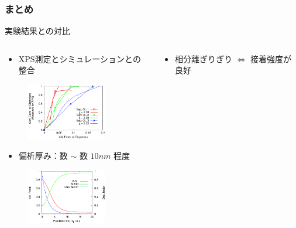 \documentclass[unicode,12pt]{beamer}%
\begin{document}
\begin{frame}\frametitle{まとめ}

\begin{center}
\color{red}実験結果との対比\color{black}
\end{center}

\begin{columns}
	\begin{column}{6.0cm}
	\vspace{-1\baselineskip}
	{\scriptsize
		\begin{itemize}
			\item XPS測定とシミュレーションとの整合
		\end{itemize}
	\vspace{-1\baselineskip}
		\begin{figure}[htbp]
			\begin{center}
				\includegraphics[width=35mm]{XPS_sin_45.eps}
			\end{center}
		\end{figure}

	\vspace{-1\baselineskip}
		\begin{itemize}
			\item 偏析厚み：数 $\sim$ 数 $10 nm$ 程度
		\end{itemize}
		
	\vspace{-1\baselineskip}
		\begin{figure}[htbp]
			\begin{center}
				\includegraphics[width=35mm]{A6_B600_Chi_03_chiS_0.0_totalA_0.04.eps}
			\end{center}
		\end{figure}
	}
	\end{column}

	\begin{column}{6.0cm}
	\vspace{-1\baselineskip}
	{\scriptsize
		\begin{itemize}
			\item 相分離ぎりぎり $\Leftrightarrow$ 接着強度が良好
		\end{itemize}
		
}
\end{column}
\end{columns}
\end{frame}
\end{document}
